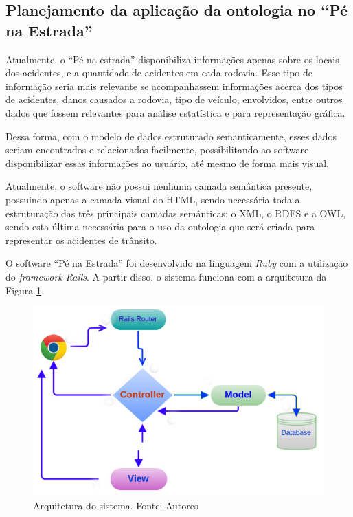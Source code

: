 \subsection{Planejamento da aplicação da ontologia no ``Pé na Estrada''}

Atualmente, o “Pé na estrada” disponibiliza informações apenas sobre os locais dos
acidentes, e a quantidade de acidentes em cada rodovia. Esse tipo de informação seria mais
relevante se acompanhassem informações acerca dos tipos de acidentes, danos causados a
rodovia, tipo de veículo, envolvidos, entre outros dados que fossem relevantes para análise
estatística e para representação gráfica.

Dessa forma, com o modelo de dados estruturado semanticamente, esses dados seriam
encontrados e relacionados facilmente, possibilitando ao software disponibilizar essas
informações ao usuário, até mesmo de forma mais visual.

Atualmente, o software não possui nenhuma camada semântica presente, possuindo
apenas a camada visual do HTML, sendo necessária toda a estruturação das três principais
camadas semânticas: o XML, o RDFS e a OWL, sendo esta última necessária para o uso da
ontologia que será criada para representar os acidentes de trânsito.

O software ``Pé na Estrada'' foi desenvolvido na linguagem \textit{Ruby} com a utilização do \textit{framework Rails}. 
A partir disso, o sistema funciona com a arquitetura da Figura \ref{fig:arquitetura}.

\begin{figure}[!htb]
 \centering
 \includegraphics[scale = 0.7]{figuras/arquiteturarails.png}
 \caption{Arquitetura do sistema. Fonte: Autores}
 \label{fig:arquitetura}

\end{figure}

